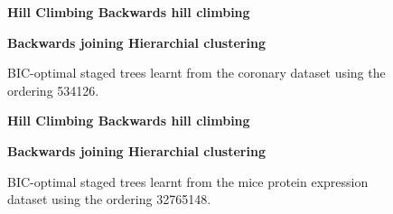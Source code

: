 \documentclass{tufte-book}
\begin{document}
\begin{figure}
   \begin{floatrow}
   \centering
   \textbf{\hspace{10mm}Hill Climbing \hspace{50mm} Backwards hill climbing}\par\medskip
{}%
\hfill
{}
   \end{floatrow}

   
      \begin{floatrow}
   \centering
   \textbf{\hspace{5mm}Backwards joining \hspace{55mm} Hierarchial clustering}\par\medskip
{}%
\hfill
{}%
   \end{floatrow}
   \caption{BIC-optimal staged trees learnt from the coronary dataset using the ordering 534126.}
\end{figure}

\begin{figure}
   \begin{floatrow}
   \centering
   \textbf{\hspace{10mm}Hill Climbing \hspace{50mm} Backwards hill climbing}\par\medskip
{}%
\hfill
{}
   \end{floatrow}

   
      \begin{floatrow}
   \centering
   \textbf{\hspace{5mm}Backwards joining \hspace{55mm} Hierarchial clustering}\par\medskip
{}%
\hfill
{}%
   \end{floatrow}
   \caption{BIC-optimal staged trees learnt from the mice protein expression dataset using the ordering 32765148.}
\end{figure}
\end{document}
